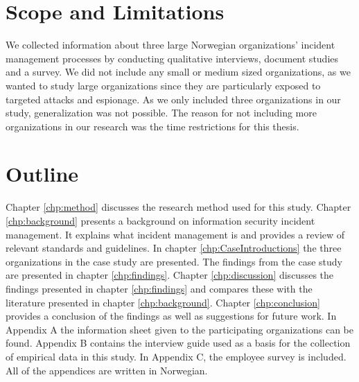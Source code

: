 \section{Scope and Limitations}
We collected information about three large Norwegian organizations' incident management processes by conducting qualitative interviews, document studies and a survey. We did not include any small or medium sized organizations, as we wanted to study large organizations since they are particularly exposed to targeted attacks and espionage. As we only included three organizations in our study, generalization was not possible. The reason for not including more organizations in our research was the time restrictions for this thesis.

\section{Outline}
Chapter \ref{chp:method} discusses the research method used for this study.
Chapter \ref{chp:background} presents a background on information security incident management. It explains what incident management is and provides a review of relevant standards and guidelines. In chapter \ref{chp:CaseIntroductions} the three organizations in the case study are presented. The findings from the case study are presented in chapter \ref{chp:findings}. Chapter \ref{chp:discussion} discusses the findings presented in chapter \ref{chp:findings} and compares these with the literature presented in chapter \ref{chp:background}. Chapter \ref{chp:conclusion} provides a conclusion of the findings as well as suggestions for future work. In Appendix A the information sheet given to the participating organizations can be found. Appendix B contains the interview guide used as a basis for the collection of empirical data in this study. In Appendix C, the employee survey is included. All of the appendices are written in Norwegian.